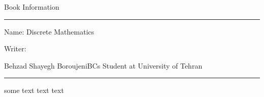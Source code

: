 \newpage
\thispagestyle{empty}
\begin{center}
    Book Information
\end{center}

\rule{\textwidth}{0.5pt}

\scriptsize{

Name: Discrete Mathematics

Writer:
\begin{AFFILIATIONS}
    \AFFILIATIONROW
    {Behzad Shayegh Boroujeni}{BCs Student at University of Tehran}{}
    {}{}{}
    {}{}{}
\end{AFFILIATIONS}

}

\rule{\textwidth}{0.5pt}

\scriptsize{
\p
some text text text
}
